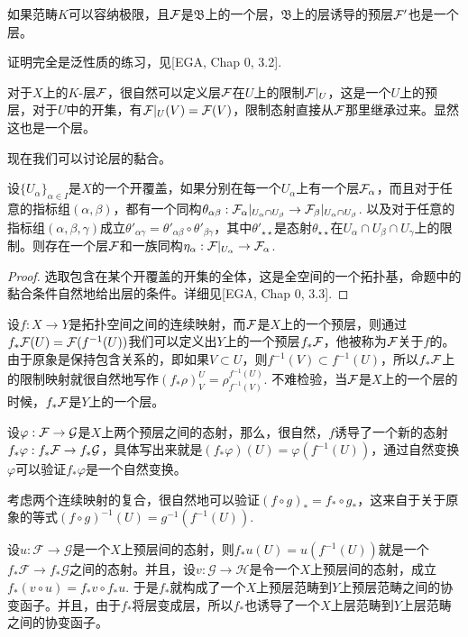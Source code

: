 \begin{pro}
如果范畴$K$可以容纳极限，且$\mathcal{F}$是$\mathfrak{B}$上的一个层，$\mathfrak{B}$上的层诱导的预层$\mathcal{F}'$也是一个层。
\end{pro}

证明完全是泛性质的练习，见[EGA, Chap 0, 3.2].

\begin{para}
对于$X$上的$K$-层$\mathcal{F}$，很自然可以定义层$\mathcal{F}$在$U$上的限制$\mathcal{F}|_U$，这是一个$U$上的预层，对于$U$中的开集，有$\mathcal{F}|_U(V)=\mathcal{F}(V)$，限制态射直接从$\mathcal{F}$那里继承过来。显然这也是一个层。
\end{para}

现在我们可以讨论层的黏合。

\begin{pro}
设$\{U_\alpha\}_{\alpha \in I}$是$X$的一个开覆盖，如果分别在每一个$U_\alpha$上有一个层$\mathcal{F}_\alpha$，而且对于任意的指标组$(\alpha,\beta)$，都有一个同构$\theta_{\alpha\beta}:\mathcal{F}_\alpha|_{U_\alpha\cap U_\beta}\to \mathcal{F}_\beta|_{U_\alpha\cap U_\beta}$. 以及对于任意的指标组$(\alpha,\beta,\gamma)$成立$\theta'_{\alpha\gamma}=\theta'_{\alpha\beta}\circ \theta'_{\beta\gamma}$，其中$\theta'_{\star\star}$是态射$\theta_{\star\star}$在$U_\alpha\cap U_\beta \cap U_\gamma$上的限制。则存在一个层$\mathcal{F}$和一族同构$\eta_\alpha:\mathcal{F}|_{U_\alpha}\to \mathcal{F}_\alpha$.
\end{pro}

\begin{proof}
选取包含在某个开覆盖的开集的全体，这是全空间的一个拓扑基，命题中的黏合条件自然地给出层的条件。详细见[EGA, Chap 0, 3.3].
\end{proof}

\begin{para}[顺像]
设$f:X\to Y$是拓扑空间之间的连续映射，而$\mathcal{F}$是$X$上的一个预层，则通过$f_*\mathcal{F}(U)=\mathcal{F}(f^{-1}(U))$我们可以定义出$Y$上的一个预层$f_*\mathcal{F}$，他被称为$\mathcal{F}$关于$f$的。 由于原象是保持包含关系的，即如果$V\subset U$，则$f^{-1}(V)\subset f^{-1}(U)$，所以$f_*\mathcal{F}$上的限制映射就很自然地写作$(f_*\rho)^U_V=\rho^{f^{-1}(U)}_{f^{-1}(V)}$. 不难检验，当$\mathcal{F}$是$X$上的一个层的时候，$f_*\mathcal{F}$是$Y$上的一个层。

设$\varphi:\mathcal{F}\to\mathcal{G}$是$X$上两个预层之间的态射，那么，很自然，$f$诱导了一个新的态射$f_*\varphi:f_*\mathcal{F}\to f_*\mathcal{G}$，具体写出来就是$(f_*\varphi)(U)=\varphi(f^{-1}(U))$，通过自然变换$\varphi$可以验证$f_*\varphi$是一个自然变换。

考虑两个连续映射的复合，很自然地可以验证$(f\circ g)_*=f_*\circ g_*$，这来自于关于原象的等式$(f\circ g)^{-1}(U)=g^{-1}(f^{-1}(U))$. 

设$u:\mathcal{F}\to\mathcal{G}$是一个$X$上预层间的态射，则$f_*u(U)=u(f^{-1}(U))$就是一个$f_*\mathcal{F}\to f_*\mathcal{G}$之间的态射。并且，设$v:\mathcal{G}\to\mathcal{H}$是令一个$X$上预层间的态射，成立$f_*(v\circ u)=f_*v\circ f_* u$. 于是$f_*$就构成了一个$X$上预层范畴到$Y$上预层范畴之间的协变函子。并且，由于$f_*$将层变成层，所以$f_*$也诱导了一个$X$上层范畴到$Y$上层范畴之间的协变函子。
\end{para}

